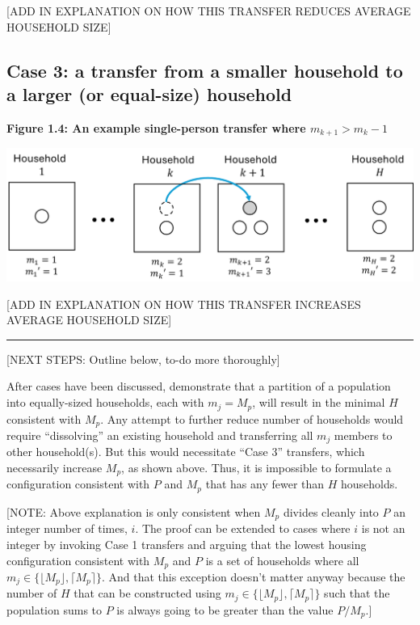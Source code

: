 \documentclass[
]{article}
\begin{document}
{[}ADD IN EXPLANATION ON HOW THIS TRANSFER REDUCES AVERAGE HOUSEHOLD
SIZE{]}

\hypertarget{case-3-a-transfer-from-a-smaller-household-to-a-larger-or-equal-size-household}{%
\subsection{Case 3: a transfer from a smaller household to a larger (or
equal-size)
household}\label{case-3-a-transfer-from-a-smaller-household-to-a-larger-or-equal-size-household}}

\textbf{Figure 1.4: An example single-person transfer where
\(m_{k+1} > m_k - 1\)}

\includegraphics[width=1\linewidth]{proof_files/figure1-5}

{[}ADD IN EXPLANATION ON HOW THIS TRANSFER INCREASES AVERAGE HOUSEHOLD
SIZE{]}

\begin{center}\rule{0.5\linewidth}{0.5pt}\end{center}

{[}NEXT STEPS: Outline below, to-do more thoroughly{]}

After cases have been discussed, demonstrate that a partition of a
population into equally-sized households, each with \(m_j = M_p\), will
result in the minimal \(H\) consistent with \(M_p\). Any attempt to
further reduce number of households would require ``dissolving'' an
existing household and transferring all \(m_j\) members to other
household(s). But this would necessitate ``Case 3'' transfers, which
necessarily increase \(M_p\), as shown above. Thus, it is impossible to
formulate a configuration consistent with \(P\) and \(M_p\) that has any
fewer than \(H\) households.

{[}NOTE: Above explanation is only consistent when \(M_p\) divides
cleanly into \(P\) an integer number of times, \(i\). The proof can be
extended to cases where \(i\) is not an integer by invoking Case 1
transfers and arguing that the lowest housing configuration consistent
with \(M_p\) and \(P\) is a set of households where all
\(m_j \in \{ \lfloor M_p \rfloor, \lceil M_p \rceil \}\). And that this
exception doesn't matter anyway because the number of \(H\) that can be
constructed using
\(m_j \in \{ \lfloor M_p \rfloor, \lceil M_p \rceil \}\) such that the
population sums to \(P\) is always going to be greater than the value
\(P / M_p\).{]}
\end{document}
